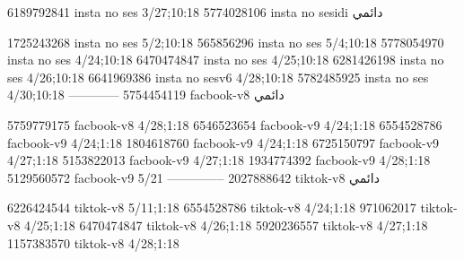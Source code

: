 
6189792841 insta no ses
3/27;10:18
5774028106 insta no sesidi
دائمي


1725243268 insta no ses
5/2;10:18
565856296 insta no ses
5/4;10:18
5778054970 insta no ses
4/24;10:18
6470474847 insta no ses
4/25;10:18
6281426198 insta no ses
4/26;10:18
6641969386 insta no sesv6
4/28;10:18
5782485925 insta no ses
4/30;10:18
------------
5754454119 facbook-v8
دائمي

5759779175 facbook-v8
4/28;1:18
6546523654 facbook-v9
4/24;1:18
6554528786 facbook-v9
4/24;1:18
1804618760 facbook-v9
4/24;1:18
6725150797 facbook-v9
4/27;1:18
5153822013 facbook-v9
4/27;1:18
1934774392 facbook-v9
4/28;1:18
5129560572 facbook-v9
5/21
--------------
2027888642 tiktok-v8
دائمي

6226424544 tiktok-v8
5/11;1:18
6554528786 tiktok-v8
4/24;1:18
971062017 tiktok-v8
4/25;1:18
6470474847 tiktok-v8
4/26;1:18
5920236557 tiktok-v8
4/27;1:18
1157383570 tiktok-v8
4/28;1:18
